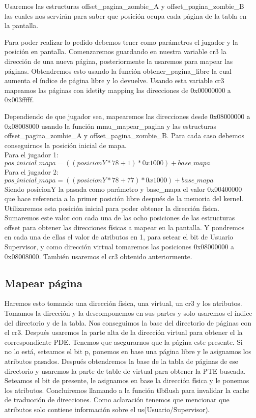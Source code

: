 \documentclass[a4paper]{article}
\begin{document}
Usaremos las estructuras offset\_pagina\_zombie\_A y offset\_pagina\_zombie\_B las cuales nos servirán para saber que posición ocupa cada página de la tabla en la pantalla. 

Para poder realizar lo pedido debemos tener como parámetros el jugador y la posición en pantalla. Comenzaremos guardando en nuestra variable cr3 la dirección de una nueva página, posteriormente la usaremos para mapear las páginas. Obtendremos esto usando la función obtener\_pagina\_libre la cual aumenta el índice de página libre y lo devuelve. Usando esta variable cr3 mapeamos las páginas con idetity mapping las direcciones de 0x00000000 a 0x003fffff.

Dependiendo de que jugador sea, mapearemos las direcciones desde 0x08000000 a 0x08008000 usando la función mmu\_mapear\_pagina y las estructuras offset\_pagina\_zombie\_A y offset\_pagina\_zombie\_B. Para cada caso debemos conseguirnos la posición inicial de mapa.
\\
Para el jugador 1:
$pos\_inicial\_mapa=((posicionY*78 + 1)* 0x1000) + base\_mapa$\\
Para el jugador 2:
$pos\_inicial\_mapa=(( posicionY*78 + 77)* 0x1000) + base\_mapa$\\

Siendo posicionY la pasada como parámetro y base\_mapa el valor 0x00400000 que hace referencia a la primer posición libre después de la memoria del kernel. Utilizaremos esta posición inicial para poder obtener la dirección física. Sumaremos este valor con cada una de las ocho posiciones de las estructuras offset para obtener las direcciones físicas a mapear en la pantalla. Y pondremos en cada una de ellas el valor de atributos en 1, para setear el bit de Usuario Supervisor, y como dirección virtual tomaremos las posiciones 0x08000000 a 0x08008000. También usaremos el cr3 obtenido anteriormente.

\subsection{Mapear página}

Haremos esto tomando una dirección física, una virtual, un cr3 y los atributos. Tomamos la dirección y la descomponemos en sus partes y solo usaremos el índice del directorio y de la tabla. Nos conseguimos la base del directorio de páginas con el cr3. Después usaremos la parte alta de la dirección virtual para obtener el la correspondiente PDE. Tenemos que asegurarnos que la página este presente. Si no lo está, seteamos el bit p, ponemos en base una página libre y le asignamos los atributos pasados. Después obtendremos la base de la tabla de páginas de ese directorio y usaremos la parte de table de virtual para obtener la PTE buscada. Seteamos el bit de presente, le asignamos en base la dirección física y le ponemos los atributos. Concluiremos llamando a la función tlbflush para invalidar la cache de traducción de direcciones. Como aclaración tenemos que mencionar que atributos solo contiene información sobre el us(Usuario/Supervisor).
\end{document}
